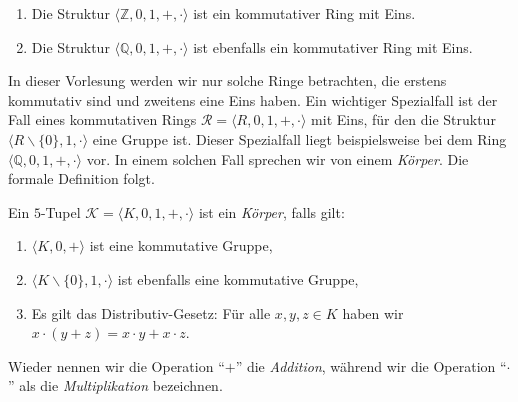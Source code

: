 \examples
\begin{enumerate}
\item Die Struktur $\langle \mathbb{Z}, 0, 1, +, \cdot \rangle$ ist ein kommutativer
      Ring mit  Eins.  
\item Die Struktur $\langle \mathbb{Q}, 0, 1, +, \cdot \rangle$ ist ebenfalls ein kommutativer Ring mit
      Eins.   \eox
\end{enumerate}

In dieser Vorlesung werden wir nur solche Ringe betrachten, die erstens kommutativ sind und
zweitens eine Eins haben. 
Ein wichtiger Spezialfall ist der Fall eines kommutativen Rings 
$\mathcal{R} = \langle R, 0, 1, +, \cdot \rangle$ mit Eins, 
für den die Struktur $\langle R \backslash \{0\}, 1, \cdot \rangle$
eine Gruppe ist.  Dieser Spezialfall liegt beispielsweise bei dem Ring  
$\langle \mathbb{Q}, 0, 1, +, \cdot \rangle$ vor.  In einem solchen Fall sprechen wir von einem \emph{Körper}.  Die formale
Definition folgt.
\pagebreak


\begin{Definition}[Körper]
Ein $5$-Tupel $\mathcal{K} = \langle K, 0, 1, +, \cdot \rangle$ ist ein \emph{Körper}, falls gilt:
\begin{enumerate}
\item $\langle K, 0, + \rangle$ ist eine kommutative Gruppe,
\item $\langle K \backslash \{ 0 \}, 1, \cdot \rangle$ ist ebenfalls eine kommutative Gruppe,
\item Es gilt das Distributiv-Gesetz: Für alle $x, y,z \in K$ haben wir
      \\[0.2cm]
      \hspace*{1.3cm} 
      $x \cdot (y + z) = x \cdot y + x \cdot z$.
\end{enumerate}
Wieder nennen wir die  Operation ``$+$'' die \emph{Addition}, während wir die Operation ``$\cdot$'' 
als die \emph{Multiplikation} bezeichnen. \eox
\end{Definition}

